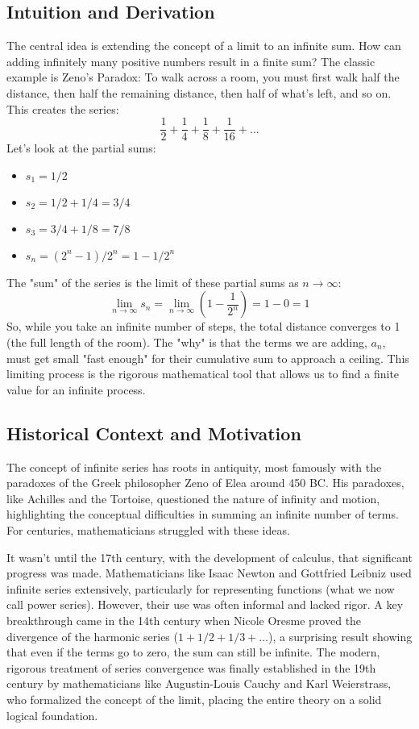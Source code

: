 \documentclass{article}
\begin{document}
\subsection{Intuition and Derivation}
The central idea is extending the concept of a limit to an infinite sum. How can adding infinitely many positive numbers result in a finite sum? The classic example is Zeno's Paradox: To walk across a room, you must first walk half the distance, then half the remaining distance, then half of what's left, and so on. This creates the series:
\[ \frac{1}{2} + \frac{1}{4} + \frac{1}{8} + \frac{1}{16} + \dots \]
Let's look at the partial sums:
\begin{itemize}
    \item $s_1 = 1/2$
    \item $s_2 = 1/2 + 1/4 = 3/4$
    \item $s_3 = 3/4 + 1/8 = 7/8$
    \item $s_n = (2^n - 1) / 2^n = 1 - 1/2^n$
\end{itemize}
The "sum" of the series is the limit of these partial sums as $n \to \infty$:
\[ \lim_{n \to \infty} s_n = \lim_{n \to \infty} (1 - \frac{1}{2^n}) = 1 - 0 = 1 \]
So, while you take an infinite number of steps, the total distance converges to 1 (the full length of the room). The "why" is that the terms we are adding, $a_n$, must get small "fast enough" for their cumulative sum to approach a ceiling. This limiting process is the rigorous mathematical tool that allows us to find a finite value for an infinite process.

\subsection{Historical Context and Motivation}
The concept of infinite series has roots in antiquity, most famously with the paradoxes of the Greek philosopher Zeno of Elea around 450 BC. His paradoxes, like Achilles and the Tortoise, questioned the nature of infinity and motion, highlighting the conceptual difficulties in summing an infinite number of terms. For centuries, mathematicians struggled with these ideas.

It wasn't until the 17th century, with the development of calculus, that significant progress was made. Mathematicians like Isaac Newton and Gottfried Leibniz used infinite series extensively, particularly for representing functions (what we now call power series). However, their use was often informal and lacked rigor. A key breakthrough came in the 14th century when Nicole Oresme proved the divergence of the harmonic series ($1 + 1/2 + 1/3 + \dots$), a surprising result showing that even if the terms go to zero, the sum can still be infinite. The modern, rigorous treatment of series convergence was finally established in the 19th century by mathematicians like Augustin-Louis Cauchy and Karl Weierstrass, who formalized the concept of the limit, placing the entire theory on a solid logical foundation.
\end{document}
